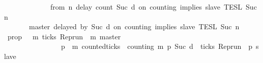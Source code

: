 \begin{isabellebody}
\isanewline
\ \ \ \ \ \ \ \ \ \ \ {\isasyminter}\ {\isasymlbrakk}\ from\ n\ delay\ count\ {\isacharparenleft}Suc\ d{\isacharparenright}\ on\ counting\ implies\ slave\ {\isasymrbrakk}\isactrlsub T\isactrlsub E\isactrlsub S\isactrlsub L\isactrlbsup {\isasymge}\ Suc\ n\isactrlesup {\isacharparenright}\isanewline
\ \ \ \ \ {\isacharparenright}\isanewline
\ \ \ \ \ {\isasyminter}\ {\isasymlbrakk}\ master\ delayed\ by\ {\isacharparenleft}Suc\ d{\isacharparenright}\ on\ counting\ implies\ slave\ {\isasymrbrakk}\isactrlsub T\isactrlsub E\isactrlsub S\isactrlsub L\isactrlbsup {\isasymge}\ Suc\ n\isactrlesup {\isacartoucheclose}\isanewline
%
\isadelimproof
%
\endisadelimproof
%
\isatagproof
{}\isamarkupfalse%
\ {\isacharminus}\isanewline
\ \ \isamarkupfalse%
\ {\isacharquery}prop\ {\isacharequal}\ {\isacartoucheopen}{\isasymlambda}{\isasymrho}\ m{\isachardot}\ ticks\ {\isacharparenleft}{\isacharparenleft}Rep{\isacharunderscore}run\ {\isasymrho}{\isacharparenright}\ m\ master{\isacharparenright}\ {\isasymlongrightarrow}\isanewline
\ \ \ \ \ \ \ \ \ \ \ \ \ \ \ \ {\isacharparenleft}{\isasymforall}p\ {\isasymge}\ m{\isachardot}\ counted{\isacharunderscore}ticks\ {\isasymrho}\ counting\ m\ p\ {\isacharparenleft}Suc\ d{\isacharparenright}\ {\isasymlongrightarrow}\ ticks\ {\isacharparenleft}{\isacharparenleft}Rep{\isacharunderscore}run\ {\isasymrho}{\isacharparenright}\ p\ slave{\isacharparenright}{\isacharparenright}{\isacartoucheclose}\isanewline

\end{isabellebody}
